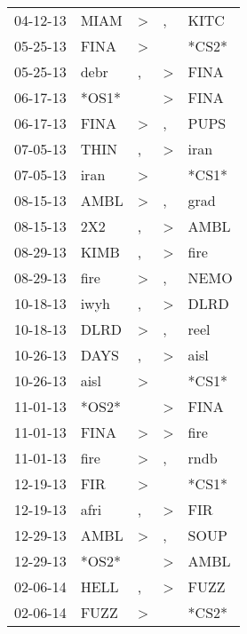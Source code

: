 \begin{supertabular}{lllll}
 04-12-13 &   MIAM &     \textgreater &                , &   KITC \\
 05-25-13 &   FINA &     \textgreater &                  &  *CS2* \\
 05-25-13 &   debr &                , &     \textgreater &   FINA \\
 06-17-13 &  *OS1* &                  &     \textgreater &   FINA \\
 06-17-13 &   FINA &     \textgreater &                , &   PUPS \\
 07-05-13 &   THIN &                , &     \textgreater &   iran \\
 07-05-13 &   iran &     \textgreater &                  &  *CS1* \\
 08-15-13 &   AMBL &     \textgreater &                , &   grad \\
 08-15-13 &    2X2 &                , &     \textgreater &   AMBL \\
 08-29-13 &   KIMB &                , &     \textgreater &   fire \\
 08-29-13 &   fire &     \textgreater &                , &   NEMO \\
 10-18-13 &   iwyh &                , &     \textgreater &   DLRD \\
 10-18-13 &   DLRD &     \textgreater &                , &   reel \\
 10-26-13 &   DAYS &                , &     \textgreater &   aisl \\
 10-26-13 &   aisl &     \textgreater &                  &  *CS1* \\
 11-01-13 &  *OS2* &                  &     \textgreater &   FINA \\
 11-01-13 &   FINA &     \textgreater &     \textgreater &   fire \\
 11-01-13 &   fire &     \textgreater &                , &   rndb \\
 12-19-13 &    FIR &     \textgreater &                  &  *CS1* \\
 12-19-13 &   afri &                , &     \textgreater &    FIR \\
 12-29-13 &   AMBL &     \textgreater &                , &   SOUP \\
 12-29-13 &  *OS2* &                  &     \textgreater &   AMBL \\
 02-06-14 &   HELL &                , &     \textgreater &   FUZZ \\
 02-06-14 &   FUZZ &     \textgreater &                  &  *CS2* \\

\end{supertabular}
